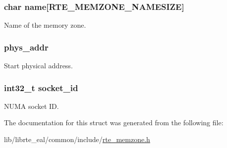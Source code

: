 \subsubsection[{name}]{\setlength{\rightskip}{0pt plus 5cm}char name\mbox{[}{\bf R\+T\+E\+\_\+\+M\+E\+M\+Z\+O\+N\+E\+\_\+\+N\+A\+M\+E\+S\+I\+Z\+E}\mbox{]}}\label{structrte__memzone_a1a1c0270e433d8ce66b34d3bd7c713fd}
Name of the memory zone. \hypertarget{structrte__memzone_a3901f538726d14b9ad14e0bd7578c959}{}
\subsubsection[{phys\+\_\+addr}]{ phys\+\_\+addr}\label{structrte__memzone_a3901f538726d14b9ad14e0bd7578c959}
Start physical address. \hypertarget{structrte__memzone_ac24d1064025151de66984ed53d5d9373}{}
\subsubsection[{socket\+\_\+id}]{\setlength{\rightskip}{0pt plus 5cm}int32\+\_\+t socket\+\_\+id}\label{structrte__memzone_ac24d1064025151de66984ed53d5d9373}
N\+U\+M\+A socket I\+D. 

The documentation for this struct was generated from the following file\+:\begin{DoxyCompactItemize}
\item 
lib/librte\+\_\+eal/common/include/\hyperlink{rte__memzone_8h}{rte\+\_\+memzone.\+h}\end{DoxyCompactItemize}
